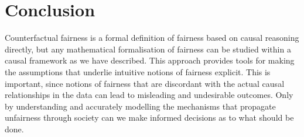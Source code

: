 \documentclass{article}
\begin{document}
\section{Conclusion}
Counterfactual fairness is a formal definition of fairness based on causal reasoning directly, but any mathematical formalisation of fairness can be studied within a causal framework as we have described. This approach provides tools for making the assumptions that underlie intuitive notions of fairness explicit. This is important, since notions of fairness that are discordant with the actual causal relationships in the data can lead to misleading and undesirable outcomes. Only by understanding and accurately modelling the mechanisms that propagate unfairness through society can we make informed decisions as to what should be done. 














\end{document}
